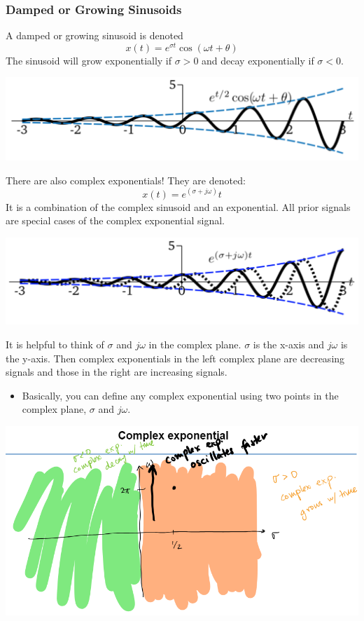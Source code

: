 \documentclass[10pt]{article}
\begin{document}
\subsubsection*{Damped or Growing Sinusoids}
A damped or growing sinusoid is denoted
\[x(t) = e^{\sigma t} \cos(\omega t + \theta)\]
The sinusoid will grow exponentially if $\sigma > 0$ and decay exponentially if $\sigma < 0$.
\begin{center}
    \includegraphics[scale=0.6]{W1_8.png}
\end{center}
There are also complex exponentials!  They are denoted:
\[x(t) = e^{(\sigma + j\omega)}t\]
It is a combination of the complex sinusoid and an exponential.  All prior signals are special cases of the complex exponential signal.
\begin{center}
    \includegraphics[scale=0.6]{W1_9.png}
\end{center}
It is helpful to think of $\sigma$ and $j\omega$ in the complex plane.  $\sigma$ is the x-axis and $j\omega$ is the y-axis.  Then complex exponentials in the left complex plane are decreasing signals and those in the right are increasing signals.
\begin{itemize}
    \item Basically, you can define any complex exponential using two points in the complex plane, $\sigma$ and $j\omega$.
\end{itemize}
\begin{center}
    \includegraphics[scale=0.8]{W1_10.png}
\end{center}
\end{document}
